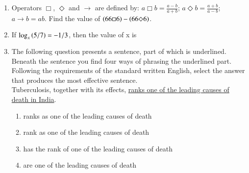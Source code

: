 \documentclass[a4paper, 11pt]{article}
\begin{document}
\begin{enumerate}
    \hfill{}

    \item Operators $\Box$, $\Diamond$ and $\rightarrow$ are defined by: $a \Box b=\frac{a-b}{a+b}$; $a \Diamond b=\frac{a+b}{a-b}$; $a \rightarrow b=ab$. Find the value of $\left(66\Box6\right)-\left(66\Diamond6\right)$.
    \begin{enumerate}
    \end{enumerate}
    
    \hfill{}

    \item If $\log_{x}\left(5/7\right)=-1/3$, then the value of x is
    \begin{enumerate}
    \end{enumerate}
    
    \hfill{}

    \item The following question presents a sentence, part of which is underlined. Beneath the sentence you find four ways of phrasing the underlined part. Following the requirements of the standard written English, select the answer that produces the most effective sentence.\\Tuberculosis, together with its effects, \underline{ranks one of the leading causes of death in India}.
    \begin{enumerate}
        \item ranks as one of the leading causes of death
        \item rank as one of the leading causes of death
        \item has the rank of one of the leading causes of death
        \item are one of the leading causes of death
    \end{enumerate}
    

\end{enumerate}
\end{document}
